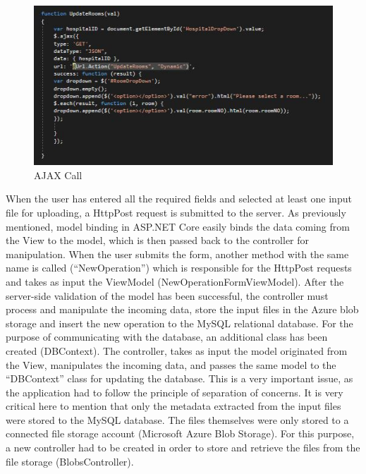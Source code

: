 \begin{figure}[!ht]
\begin{center}
\includegraphics[width=17cm]{imgs/ajax.jpg}
\end{center}\vspace{-0.3cm}
\caption[AJAX Call]{AJAX Call} \label{ajax}
\end{figure}

When the user has entered all the required fields and selected at least one input file for uploading, a HttpPost request is submitted to the server. As previously mentioned, model binding in ASP.NET Core easily binds the data coming from the View to the model, which is then passed back to the controller for manipulation. When the user submits the form, another method with the same name is called (``NewOperation'') which is responsible for the HttpPost requests and takes as input the ViewModel (NewOperationFormViewModel).
After the server-side validation of the model has been successful, the controller must process and manipulate the incoming data, store the input files in the Azure blob storage and insert the new operation to the MySQL relational database. For the purpose of communicating with the database, an additional class has been created (DBContext). The controller, takes as input the model originated from the View, manipulates the incoming data, and passes the same model to the ``DBContext'' class for updating the database. This is a very important issue, as the application had to follow the principle of separation of concerns.
It is very critical here to mention that only the metadata extracted from the input files were stored to the MySQL database. The files themselves were only stored to a connected file storage account (Microsoft Azure Blob Storage). For this purpose, a new controller had to be created in order to store and retrieve the files from the file storage (BlobsController).

